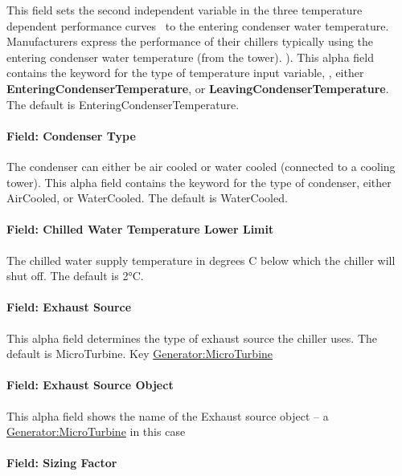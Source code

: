 This field sets the second independent variable in the three temperature dependent performance curves~ to the entering condenser water temperature. Manufacturers express the performance of their chillers typically using the entering condenser water temperature (from the tower). ). This alpha field contains the keyword for the type of temperature input variable, , either \textbf{EnteringCondenserTemperature}, or \textbf{LeavingCondenserTemperature}. The default is EnteringCondenserTemperature.

\paragraph{Field: Condenser Type}\label{field-condenser-type-6}

The condenser can either be air cooled or water cooled (connected to a cooling tower). This alpha field contains the keyword for the type of condenser, either AirCooled, or WaterCooled. The default is WaterCooled.

\paragraph{Field: Chilled Water Temperature Lower Limit}\label{field-chilled-water-temperature-lower-limit-1}

The chilled water supply temperature in degrees C below which the chiller will shut off. The default is 2°C.

\paragraph{Field: Exhaust Source}\label{field-exhaust-source}

This alpha field determines the type of exhaust source the chiller uses. The default is MicroTurbine. Key \hyperref[generatormicroturbine]{Generator:MicroTurbine}

\paragraph{Field: Exhaust Source Object}\label{field-exhaust-source-object}

This alpha field shows the name of the Exhaust source object -- a \hyperref[generatormicroturbine]{Generator:MicroTurbine} in this case

\paragraph{Field: Sizing Factor}\label{field-sizing-factor-9}

